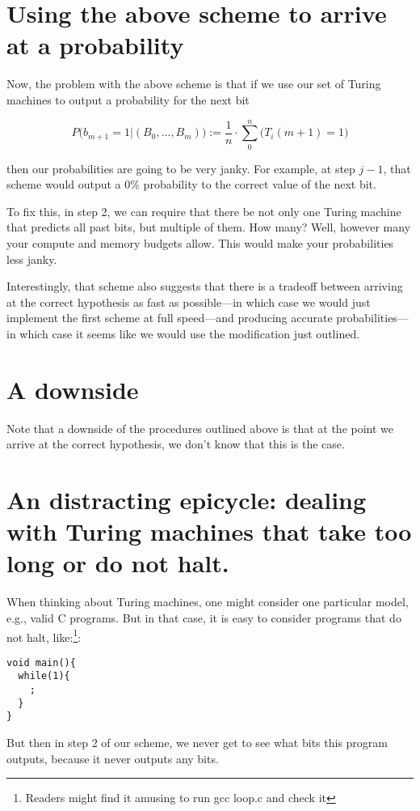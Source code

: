 \documentclass[12pt,authoryear]{elsarticle}
\begin{document}
\section{Using the above scheme to arrive at a probability }

Now, the problem with the above scheme is that if we use our set of Turing machines to output a probability for the next bit

$$ P\Big(b_{m + 1} = 1 | (B_0, ..., B_m) \Big) := \frac{1}{n} \cdot \sum_0^n \Big(T_i(m+1) = 1\Big) $$

then our probabilities are going to be very janky. For example, at step $ j - 1 $, that scheme would output a 0\% probability to the correct value of the next bit.

To fix this, in step 2, we can require that there be not only one Turing machine that predicts all past bits, but multiple of them. How many? Well, however many your compute and memory budgets allow. This would make your probabilities less janky. 

Interestingly, that scheme also suggests that there is a tradeoff between arriving at the correct hypothesis as fast as possible—in which case we would just implement the first scheme at full speed—and producing accurate probabilities—in which case it seems like we would use the modification just outlined.

\section{A downside}
Note that a downside of the procedures outlined above is that at the point we arrive at the correct hypothesis, we don't know that this is the case.

\section{An distracting epicycle: dealing with Turing machines that take too long or do not halt.}

When thinking about Turing machines, one might consider one particular model, e.g., valid C programs. But in that case, it is easy to consider programs that do not halt, like:\footnote{Readers might find it amusing to run gcc loop.c and check it}:

\begin{verbatim}
void main(){
  while(1){
    ;
  }
}
\end{verbatim}

But then in step 2 of our scheme, we never get to see what bits this program outputs, because it never outputs any bits.
\end{document}
